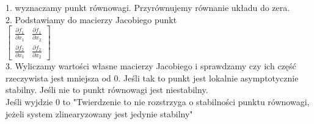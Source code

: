 1. wyznaczamy punkt równowagi. Przyrównujemy równanie układu do zera.\\
2. Podstawiamy do macierzy Jacobiego punkt\\
$\left[ \begin{array}{cc}    \frac{\partial f_1}{\partial x_1} &\frac{\partial f_1}{\partial x_2} \\ \frac{\partial f_2}{\partial x_1} & \frac{\partial f_2}{\partial x_2}   \end{array}\right]$\\
3. Wyliczamy wartości własne macierzy Jacobiego i sprawdzamy czy ich część rzeczywista jest mniejsza od 0. Jeśli tak to punkt jest lokalnie asymptotycznie stabilny. Jeśli nie to punkt równowagi jest niestabilny.\\
Jeśli wyjdzie 0 to "Twierdzenie to nie rozstrzyga o stabilności punktu równowagi, jeżeli system zlinearyzowany jest jedynie stabilny"

\pagebreak
